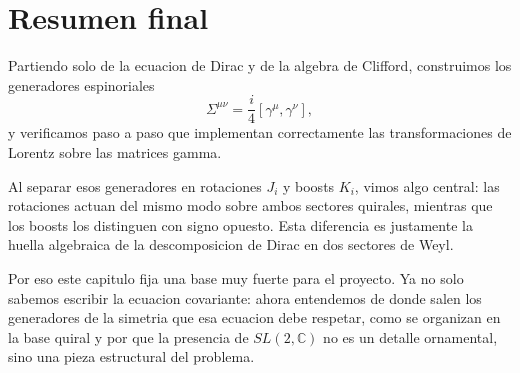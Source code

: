 \section{Resumen final}
Partiendo solo de la ecuacion de Dirac y de la algebra de Clifford, construimos los generadores espinoriales
\[
\Sigma^{\mu\nu}=\frac{i}{4}[\gamma^\mu,\gamma^\nu],
\]
y verificamos paso a paso que implementan correctamente las transformaciones de Lorentz sobre las matrices gamma.

Al separar esos generadores en rotaciones \(J_i\) y boosts \(K_i\), vimos algo central: las rotaciones actuan del mismo modo sobre ambos sectores quirales, mientras que los boosts los distinguen con signo opuesto. Esta diferencia es justamente la huella algebraica de la descomposicion de Dirac en dos sectores de Weyl.

Por eso este capitulo fija una base muy fuerte para el proyecto. Ya no solo sabemos escribir la ecuacion covariante: ahora entendemos de donde salen los generadores de la simetria que esa ecuacion debe respetar, como se organizan en la base quiral y por que la presencia de \(SL(2,\mathbb{C})\) no es un detalle ornamental, sino una pieza estructural del problema.
